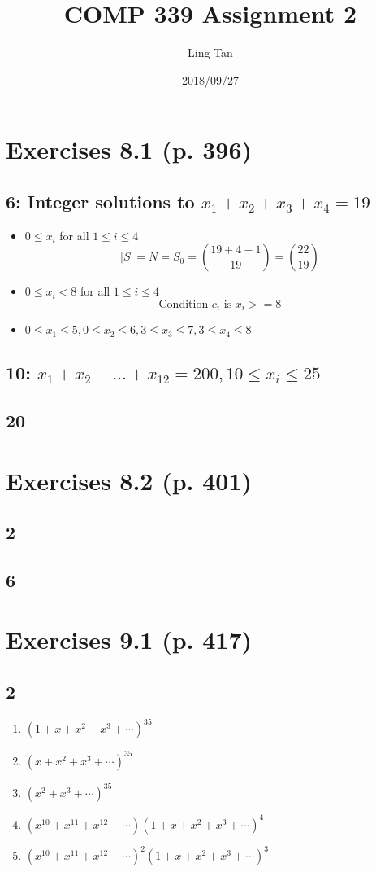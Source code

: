 \documentclass[a4paper]{article}
\title{COMP 339 Assignment 2}
\author{Ling Tan}
\date{2018/09/27}
\begin{document}
\maketitle

\section{Exercises 8.1 (p. 396)}
\subsection{6: Integer solutions to $x_1+x_2+x_3+x_4=19$}
\begin{itemize}
    \item $0\leq x_i$ for all $1\leq i\leq 4$\\
    $$|S| = N =S_0=\binom{19+4-1}{19}=\binom{22}{19}$$
    \item $0\leq x_i < 8$ for all $1\leq i\leq 4$\\
    $$\text{Condition }c_i\text{ is }x_i>=8$$
    
    \item $0\leq x_1 \leq 5, 0\leq x_2 \leq 6, 3\leq x_3 \leq 7, 3\leq x_4 \leq 8$
\end{itemize}
\subsection{10: $x_1+x_2+\dots+x_{12}=200,10\leq x_i\leq25$}
\subsection{20}

\section{Exercises 8.2 (p. 401)}
\subsection{2}
\subsection{6}
\newpage
\section{Exercises 9.1 (p. 417) }
\subsection{2}
\begin{enumerate}[label=(\alph*)]
    \item $(1+x+x^2+x^3+\cdots)^35$
    \item $(x+x^2+x^3+\cdots)^35$
    \item $(x^2+x^3+\cdots)^35$
    \item $(x^{10}+x^{11}+x^{12}+\cdots)(1+x+x^2+x^3+\cdots)^4$
    \item $(x^{10}+x^{11}+x^{12}+\cdots)^2(1+x+x^2+x^3+\cdots)^3$
\end{enumerate}
    
\end{document}
